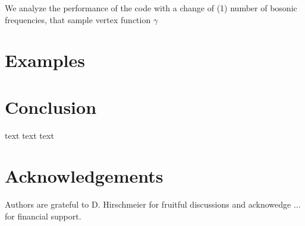 \documentclass[3p,times,procedia]{elsarticle}
\begin{document}
We analyze the performance of the code with a change of (1) number of bosonic frequencies, that sample vertex function $\gamma$ 

\section{Examples}


\section{Conclusion}
text text text


\section*{Acknowledgements}
Authors are grateful to D. Hirschmeier for fruitful discussions and acknowedge ... for financial support.
\end{document}

